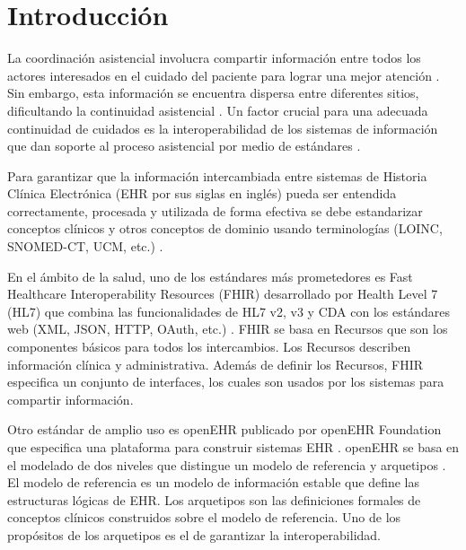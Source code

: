 \section{Introducción}

La coordinación asistencial involucra compartir información entre todos los actores interesados en el cuidado del paciente para lograr una mejor atención \cite{CareCoordination}. Sin embargo, esta información se encuentra dispersa entre diferentes sitios, dificultando la continuidad asistencial \cite{Indarte11}. Un factor crucial para una adecuada continuidad de cuidados es la interoperabilidad de los sistemas de información que dan soporte al proceso asistencial por medio de estándares \cite{OPS16}.

Para garantizar que la información intercambiada entre sistemas de Historia Clínica Electrónica (EHR por sus siglas en inglés) pueda ser entendida correctamente, procesada y utilizada de forma efectiva se debe estandarizar conceptos clínicos y otros conceptos de dominio usando terminologías (LOINC, SNOMED-CT, UCM, etc.) \cite{ISO20514}.

En el ámbito de la salud, uno de los estándares más prometedores es Fast Healthcare Interoperability Resources (FHIR) desarrollado por Health Level 7 (HL7) que combina las funcionalidades de HL7 v2, v3 y CDA con los estándares web (XML, JSON, HTTP, OAuth, etc.) \cite{FHIR}. FHIR se basa en Recursos que son los componentes básicos para todos los intercambios. Los Recursos describen información clínica y administrativa. Además de definir los Recursos, FHIR especifica un conjunto de interfaces, los cuales son usados por los sistemas para compartir información.

Otro estándar de amplio uso es openEHR publicado por openEHR Foundation que especifica una plataforma para construir sistemas EHR \cite{openEHR}. openEHR se basa en el modelado de dos niveles que distingue un modelo de referencia y arquetipos \cite{Bale00}. El modelo de referencia es un modelo de información estable que define las estructuras lógicas de EHR. Los arquetipos son las definiciones formales de conceptos clínicos construidos sobre el modelo de referencia. Uno de los propósitos de los arquetipos es el de garantizar la interoperabilidad.

